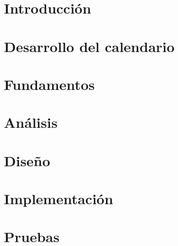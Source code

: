 \documentclass[a4paper,12pt]{scrbook}
\begin{document}



\cleardoublepage


\cleardoublepage


\cleardoublepage


\cleardoublepage

\tableofcontents
\listoffigures

\setlength{\parskip}{1.2ex plus 0.4ex minus 0.1ex}

\chapter{Introducción}
\label{chap:introduccion}


\chapter{Desarrollo del calendario}
\label{chap:calendario}
%

\chapter{Fundamentos}
\label{chap:fundamentos}
%

\chapter{Análisis}
\label{chap:analisis}
%

\chapter{Diseño}
\label{chap:diseno}
%

\chapter{Implementación}
\label{chap:implementacion}
%

\chapter{Pruebas}
\label{chap:pruebas}
%
\end{document}
